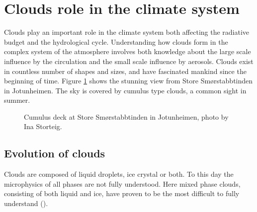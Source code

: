 \section{Clouds role in the climate system} \label{sec:cloud_in_climate_system}
Clouds play an important role in the climate system both affecting the radiative budget and the hydrological cycle. Understanding how clouds form in the complex system of the atmosphere involves both knowledge about the large scale influence by the circulation and the small scale influence by aerosols. Clouds exist in countless number of shapes and sizes, and have fascinated mankind since the beginning of time. Figure \ref{fig:cloud_cover_jotunheimen} shows the stunning view from Store Smørstabbtinden in Jotunheimen. The sky is covered by cumulus type clouds, a common sight in summer.
\begin{figure}
    \centering
    \caption[Cumulus deck at Store Smørstabbtinden in Jotunheimen]{Cumulus deck at Store Smørstabbtinden in Jotunheimen, photo by Ina Storteig.}
    \label{fig:cloud_cover_jotunheimen}
\end{figure}

\subsection{Evolution of clouds}
Clouds are composed of liquid droplets, ice crystal or both. To this day the microphysics of all phases are not fully understood. Here mixed phase clouds, consisting of both liquid and ice, have proven to be the most difficult to fully understand (\cite{IPCC_CH7_clouds}). 

